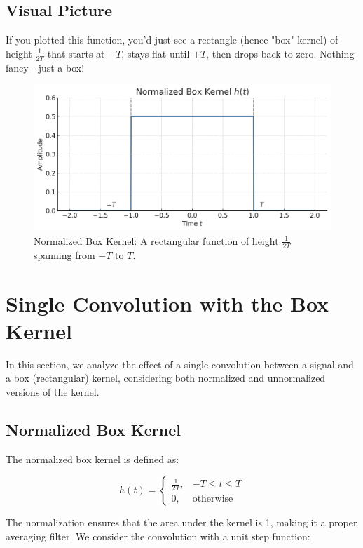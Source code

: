 \documentclass{article}
\begin{document}
\subsection*{Visual Picture}

If you plotted this function, you'd just see a rectangle (hence "box" kernel) of height $\frac{1}{2T}$ that starts at $-T$, stays flat until $+T$, then drops back to zero. Nothing fancy - just a box!

\begin{figure}
        \centering
        \includegraphics[width=1\linewidth]{figs/normal.png}
        \caption{Normalized Box Kernel: A rectangular function of height $\frac{1}{2T}$ spanning from $-T$ to $T$.}
        \label{fig:enter-label}
    \end{figure}
  
\section{Single Convolution with the Box Kernel}

In this section, we analyze the effect of a single convolution between a signal and a box (rectangular) kernel, considering both normalized and unnormalized versions of the kernel.

\subsection{Normalized Box Kernel}

The normalized box kernel is defined as:

\[
h(t) =
\begin{cases}
\frac{1}{2T}, & -T \le t \le T \\
0, & \text{otherwise}
\end{cases}
\]

The normalization ensures that the area under the kernel is 1, making it a proper averaging filter. We consider the convolution with a unit step function:
\end{document}
